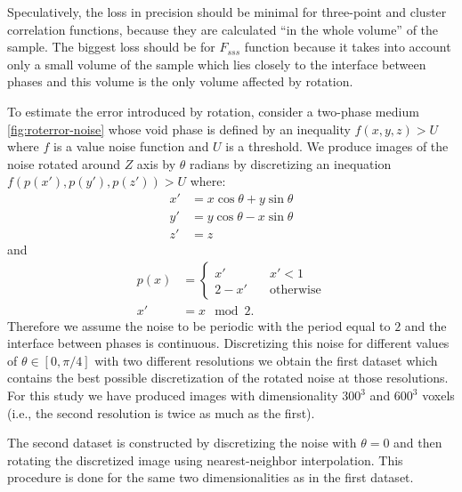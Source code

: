 \documentclass[reprint,amsmath,amssymb,aps,pre,showkeys,showpacs]{revtex4-1}
\begin{document}
Speculatively, the loss in precision should be minimal for three-point and
cluster correlation functions, because they are calculated
``in the whole volume'' of the sample. The biggest loss should be for $F_{sss}$
function because it takes into account only a small volume of the sample which
lies closely to the interface between phases and this volume is the only volume
affected by rotation.

To estimate the error introduced by rotation, consider a two-phase medium
\cref{fig:roterror-noise} whose void phase is defined by an inequality
$f(x, y, z) > U$ where $f$ is a value noise function
\cite[Section IV.B]{samarin2023robust} and $U$ is a threshold. We produce images
of the noise rotated around $Z$ axis by $\theta$ radians by discretizing an
inequation $f(p(x'), p(y'), p(z')) > U$ where:
\begin{equation*}
  \begin{aligned}
    x' &= x \cos \theta + y \sin \theta \\
    y' &= y \cos \theta - x \sin \theta \\
    z' &= z
  \end{aligned}
\end{equation*}
and
\begin{equation*}
  \begin{aligned}
    p(x) &= \left\{
    \begin{array}{ll}
      x'     & \quad x' < 1 \\
      2 - x' & \quad \text{otherwise}
    \end{array}
    \right. \\
    x ' &= x \mod 2.
  \end{aligned}
\end{equation*}
Therefore we assume the noise to be periodic with the period equal to $2$ and
the interface between phases is continuous. Discretizing this noise for
different values of $\theta \in [0, \pi/4]$ with two different resolutions we
obtain the first dataset which contains the best possible discretization of the
rotated noise at those resolutions. For this study we have produced images with
dimensionality $300^3$ and $600^3$ voxels (i.e., the second resolution is twice
as much as the first).

The second dataset is constructed by discretizing the noise with $\theta = 0$ and
then rotating the discretized image using nearest-neighbor interpolation. This
procedure is done for the same two dimensionalities as in the first dataset.
\end{document}
